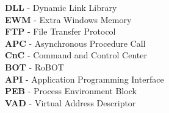 \textbf{DLL} - Dynamic Link Library \\
\textbf{EWM} - Extra Windows Memory \\
\textbf{FTP} - File Transfer Protocol \\
\textbf{APC} - Asynchronous Procedure Call \\
\textbf{CnC} - Command and Control Center \\
\textbf{BOT} - RoBOT \\
\textbf{API} - Application Programming Interface \\
\textbf{PEB} - Process Environment Block \\
\textbf{VAD} - Virtual Address Descriptor \\